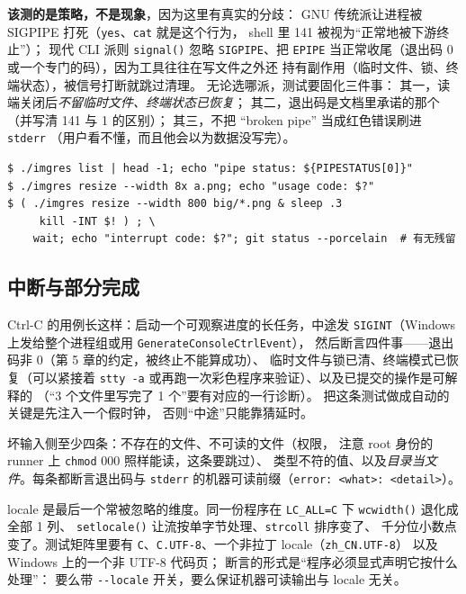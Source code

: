 \documentclass[12pt,a4paper,fontset=fandol]{ctexbook}
\newcommand{\Fn}[1]{\texttt{#1()}}
\newcommand{\Tp}[1]{\texttt{#1}}
\newcommand{\Opt}[1]{\texttt{-\/-#1}}
\begin{document}
\textbf{该测的是策略，不是现象}，因为这里有真实的分歧：
GNU 传统派让进程被 SIGPIPE 打死（\Tp{yes}、\Tp{cat} 就是这个行为，
shell 里 141 被视为``正常地被下游终止''）；
现代 CLI 派则 \Fn{signal} 忽略 \Tp{SIGPIPE}、把 \Tp{EPIPE}
当正常收尾（退出码 0 或一个专门的码），因为工具往往在写文件之外还
持有副作用（临时文件、锁、终端状态），被信号打断就跳过清理。
无论选哪派，测试要固化三件事：
其一，读端关闭后\emph{不留临时文件、终端状态已恢复}；
其二，退出码是文档里承诺的那个（并写清 141 与 1 的区别）；
其三，不把 ``broken pipe'' 当成红色错误刷进 \Tp{stderr}
（用户看不懂，而且他会以为数据没写完）。

\begin{lstlisting}[style=shellstyle,caption={失败路径的三条手工探针}]
$ ./imgres list | head -1; echo "pipe status: ${PIPESTATUS[0]}"
$ ./imgres resize --width 8x a.png; echo "usage code: $?"
$ ( ./imgres resize --width 800 big/*.png & sleep .3
     kill -INT $! ) ; \
    wait; echo "interrupt code: $?"; git status --porcelain  # 有无残留
\end{lstlisting}

\subsection{中断与部分完成}

Ctrl-C 的用例长这样：启动一个可观察进度的长任务，中途发
\Tp{SIGINT}（Windows 上发给整个进程组或用 \Tp{GenerateConsoleCtrlEvent}），
然后断言四件事——退出码非 0（第 5 章的约定，被终止不能算成功）、
临时文件与锁已清、终端模式已恢复（可以紧接着 \lstinline|stty -a|
或再跑一次彩色程序来验证）、以及已提交的操作是可解释的
（``3 个文件里写完了 1 个''要有对应的一行诊断）。
把这条测试做成自动的关键是先注入一个假时钟，
否则``中途''只能靠猜延时。

坏输入侧至少四条：不存在的文件、不可读的文件（权限，
注意 root 身份的 runner 上 \Tp{chmod} 000 照样能读，这条要跳过）、
类型不符的值、以及\emph{目录当文件}。每条都断言退出码与
\Tp{stderr} 的机器可读前缀（\lstinline|error: <what>: <detail>|）。

locale 是最后一个常被忽略的维度。同一份程序在
\lstinline|LC_ALL=C| 下 \Fn{wcwidth} 退化成全部 1 列、
\Fn{setlocale} 让流按单字节处理、\lstinline|strcoll| 排序变了、
千分位小数点变了。测试矩阵里要有
\Tp{C}、\Tp{C.UTF-8}、一个非拉丁 locale（\Tp{zh\_CN.UTF-8}）
以及 Windows 上的一个非 UTF-8 代码页；
断言的形式是``程序必须显式声明它按什么处理''：
要么带 \Opt{locale} 开关，要么保证机器可读输出与 locale 无关。
\end{document}
